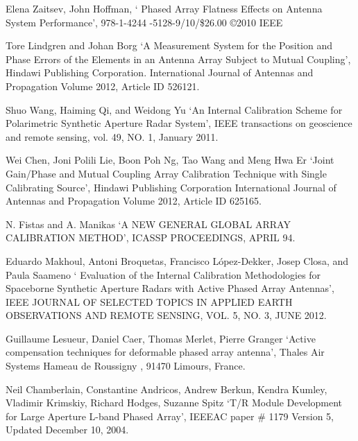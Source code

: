 \documentclass[a4paper,10pt]{article}
\begin{document}
\begin{enumerate}[ {[}1{]} ]
		\item \label{ppr:aligment5} Elena Zaitsev, John Hoffman, \enquote*{
		Phased Array Flatness Effects on Antenna System Performance}, 978-1-4244
		-5128-9/10/\$26.00 \copyright 2010 IEEE

		
		\item Tore Lindgren and Johan Borg \enquote*{A Measurement System for 
		the Position and Phase Errors of the Elements in an Antenna Array 
		Subject to Mutual Coupling}, Hindawi Publishing Corporation. 
		International Journal of Antennas and Propagation Volume 2012, 
		Article ID 526121.

		\item \label{ppr:classic7} Shuo Wang, Haiming Qi, and Weidong Yu 
		\enquote*{An Internal Calibration Scheme for Polarimetric Synthetic 
		Aperture Radar System}, IEEE transactions on geoscience and remote 
		sensing, vol. 49, NO. 1, January 2011.
		
		\item \label{ppr:mutual-ext1} Wei Chen, Joni Polili Lie, Boon Poh Ng, 
		Tao Wang and Meng Hwa Er \enquote*{Joint Gain/Phase and Mutual Coupling
		Array Calibration Technique with Single Calibrating Source}, Hindawi 
		Publishing Corporation International Journal of Antennas and Propagation
		Volume 2012, Article ID 625165.

		
		\item N. Fistas and A. Manikas \enquote*{A NEW GENERAL GLOBAL ARRAY 
		CALIBRATION METHOD}, ICASSP PROCEEDINGS, APRIL 94.
		
		\item \label{ppr:classic8} Eduardo Makhoul, Antoni Broquetas, 
		Francisco López-Dekker, Josep Closa, and Paula Saameno \enquote*{
		Evaluation of the Internal Calibration Methodologies for Spaceborne 
		Synthetic Aperture Radars with Active Phased Array Antennas}, IEEE 
		JOURNAL OF SELECTED TOPICS IN APPLIED EARTH OBSERVATIONS AND REMOTE 
		SENSING, VOL. 5, NO. 3, JUNE 2012.

		\item \label{ppr:aligment6} Guillaume Lesueur, Daniel Caer, Thomas 
		Merlet, Pierre Granger \enquote*{Active compensation techniques for 
		deformable phased array antenna}, Thales Air Systems Hameau de Roussigny
		, 91470 Limours, France.

		\item Neil Chamberlain, Constantine Andricos, Andrew Berkun, Kendra 
		Kumley, Vladimir Krimskiy, Richard Hodges, Suzanne Spitz \enquote*{T/R 
		Module Development for Large Aperture L-band Phased Array}, IEEEAC paper
		\# 1179 Version 5, Updated December 10, 2004.


\end{enumerate}
\end{document}
